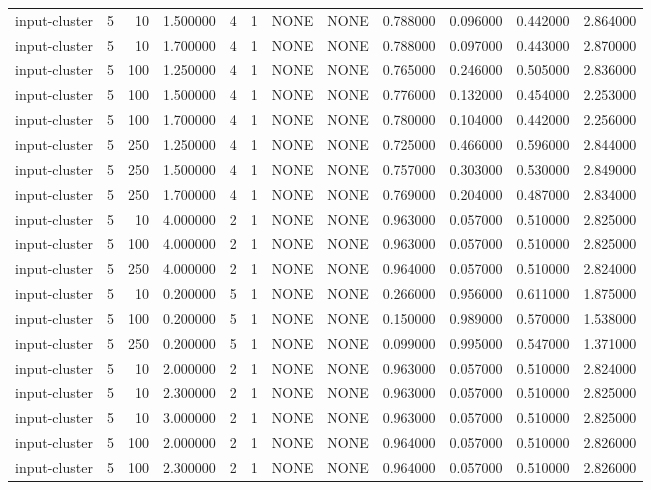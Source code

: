 \begin{tabular}{lrrrllllrrrr}
input-cluster & 5 & 10 & 1.500000 & 4 & 1 & NONE & NONE & 0.788000 & 0.096000 & 0.442000 & 2.864000 \\
input-cluster & 5 & 10 & 1.700000 & 4 & 1 & NONE & NONE & 0.788000 & 0.097000 & 0.443000 & 2.870000 \\
input-cluster & 5 & 100 & 1.250000 & 4 & 1 & NONE & NONE & 0.765000 & 0.246000 & 0.505000 & 2.836000 \\
input-cluster & 5 & 100 & 1.500000 & 4 & 1 & NONE & NONE & 0.776000 & 0.132000 & 0.454000 & 2.253000 \\
input-cluster & 5 & 100 & 1.700000 & 4 & 1 & NONE & NONE & 0.780000 & 0.104000 & 0.442000 & 2.256000 \\
input-cluster & 5 & 250 & 1.250000 & 4 & 1 & NONE & NONE & 0.725000 & 0.466000 & 0.596000 & 2.844000 \\
input-cluster & 5 & 250 & 1.500000 & 4 & 1 & NONE & NONE & 0.757000 & 0.303000 & 0.530000 & 2.849000 \\
input-cluster & 5 & 250 & 1.700000 & 4 & 1 & NONE & NONE & 0.769000 & 0.204000 & 0.487000 & 2.834000 \\
input-cluster & 5 & 10 & 4.000000 & 2 & 1 & NONE & NONE & 0.963000 & 0.057000 & 0.510000 & 2.825000 \\
input-cluster & 5 & 100 & 4.000000 & 2 & 1 & NONE & NONE & 0.963000 & 0.057000 & 0.510000 & 2.825000 \\
input-cluster & 5 & 250 & 4.000000 & 2 & 1 & NONE & NONE & 0.964000 & 0.057000 & 0.510000 & 2.824000 \\
input-cluster & 5 & 10 & 0.200000 & 5 & 1 & NONE & NONE & 0.266000 & 0.956000 & 0.611000 & 1.875000 \\
input-cluster & 5 & 100 & 0.200000 & 5 & 1 & NONE & NONE & 0.150000 & 0.989000 & 0.570000 & 1.538000 \\
input-cluster & 5 & 250 & 0.200000 & 5 & 1 & NONE & NONE & 0.099000 & 0.995000 & 0.547000 & 1.371000 \\
input-cluster & 5 & 10 & 2.000000 & 2 & 1 & NONE & NONE & 0.963000 & 0.057000 & 0.510000 & 2.824000 \\
input-cluster & 5 & 10 & 2.300000 & 2 & 1 & NONE & NONE & 0.963000 & 0.057000 & 0.510000 & 2.825000 \\
input-cluster & 5 & 10 & 3.000000 & 2 & 1 & NONE & NONE & 0.963000 & 0.057000 & 0.510000 & 2.825000 \\
input-cluster & 5 & 100 & 2.000000 & 2 & 1 & NONE & NONE & 0.964000 & 0.057000 & 0.510000 & 2.826000 \\
input-cluster & 5 & 100 & 2.300000 & 2 & 1 & NONE & NONE & 0.964000 & 0.057000 & 0.510000 & 2.826000 \\

\end{tabular}

